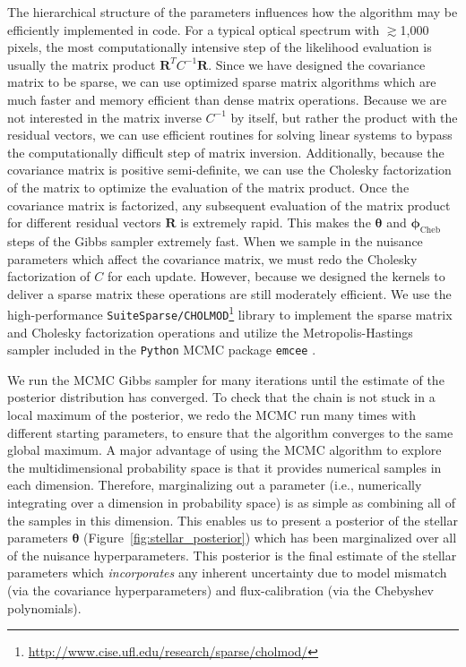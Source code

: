 \documentclass[iop,floatfix]{emulateapj}
\newcommand{\vt}{ {\bm \theta}}
\newcommand{\fR}{ {\bm R}}
\newcommand{\vt}{ {\bm \theta}}
\newcommand{\vp}{ {\bm \phi}}
\newcommand{\stellarParameters}{\vt}
\newcommand{\cheb}{ \vp_{\textrm{Cheb}}}
\begin{document}
The hierarchical structure of the parameters influences how the algorithm may be efficiently implemented in code. For a typical optical spectrum with $\gtrsim$1,000 pixels, the most computationally intensive step of the likelihood evaluation is usually the matrix product $\fR^T C^{-1} \fR$. Since we have designed the covariance matrix to be sparse, we can use optimized sparse matrix algorithms which are much faster and memory efficient than dense matrix operations. Because we are not interested in the matrix inverse $C^{-1}$ by itself, but rather the product with the residual vectors, we can use efficient routines for solving linear systems to bypass the computationally difficult step of matrix inversion. Additionally, because the covariance matrix is positive semi-definite, we can use the Cholesky factorization of the matrix to optimize the evaluation of the matrix product. Once the covariance matrix is factorized, any subsequent evaluation of the matrix product for different residual vectors $\fR$ is extremely rapid. This makes the $\stellarParameters$ and $\cheb$ steps of the Gibbs sampler extremely fast.
When we sample in the nuisance parameters which affect the covariance matrix, we must redo the Cholesky factorization of $C$ for each update. However, because we designed the kernels to deliver a sparse matrix these operations are still moderately efficient.  We use the high-performance \texttt{SuiteSparse/CHOLMOD}\footnote{\url{http://www.cise.ufl.edu/research/sparse/cholmod/}} library to implement the sparse matrix and Cholesky factorization operations \citep{chen08, davis09} and utilize the Metropolis-Hastings sampler included in the \texttt{Python} MCMC package \texttt{emcee} \citep{foreman-mackey12}.

We run the MCMC Gibbs sampler for many iterations until the estimate of the posterior distribution has converged. To check that the chain is not stuck in a local maximum of the posterior, we redo the MCMC run many times with different starting parameters, to ensure that the algorithm converges to the same global maximum. A major advantage of using the MCMC algorithm to explore the multidimensional probability space is that it provides numerical samples in each dimension. Therefore, marginalizing out a parameter (i.e., numerically integrating over a dimension in probability space) is as simple as combining all of the samples in this dimension. This enables us to present a posterior of the stellar parameters $\stellarParameters$ (Figure~\ref{fig:stellar_posterior}) which has been marginalized over all of the nuisance hyperparameters. This posterior is the final estimate of the stellar parameters which \emph{incorporates} any inherent uncertainty due to model mismatch (via the covariance hyperparameters) and flux-calibration (via the Chebyshev polynomials).
\end{document}
